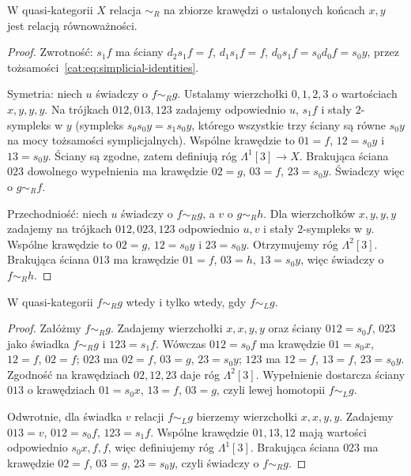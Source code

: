 \begin{lemat}\label{cat:lem:right-homotopy-equivalence}
W quasi-kategorii $X$ relacja $\sim_R$ na zbiorze krawędzi o ustalonych końcach $x,y$ jest relacją równoważności.
\end{lemat}
\begin{proof}
Zwrotność: $s_1f$ ma ściany $d_2s_1f=f$, $d_1s_1f=f$, $d_0s_1f=s_0d_0f=s_0y$, przez tożsamości~\eqref{cat:eq:simplicial-identities}.

Symetria: niech $u$ świadczy o $f\sim_R g$. Ustalamy wierzchołki $0,1,2,3$ o wartościach $x,y,y,y$. Na trójkach $012,013,123$ zadajemy odpowiednio $u$, $s_1f$ i stały $2$-sympleks w $y$ (sympleks $s_0s_0y=s_1s_0y$, którego wszystkie trzy ściany są równe $s_0y$ na mocy tożsamości symplicjalnych). Wspólne krawędzie to $01=f$, $12=s_0y$ i $13=s_0y$. Ściany są zgodne, zatem definiują róg $\Lambda^1[3]\to X$. Brakująca ściana $023$ dowolnego wypełnienia ma krawędzie $02=g$, $03=f$, $23=s_0y$. Świadczy więc o $g\sim_R f$.

Przechodniość: niech $u$ świadczy o $f\sim_R g$, a $v$ o $g\sim_R h$. Dla wierzchołków $x,y,y,y$ zadajemy na trójkach $012,023,123$ odpowiednio $u,v$ i stały $2$-sympleks w $y$. Wspólne krawędzie to $02=g$, $12=s_0y$ i $23=s_0y$. Otrzymujemy róg $\Lambda^2[3]$. Brakująca ściana $013$ ma krawędzie $01=f$, $03=h$, $13=s_0y$, więc świadczy o $f\sim_R h$.
\end{proof}

\begin{stwierdzenie}\label{cat:prop:left-right-homotopy}
W quasi-kategorii $f\sim_R g$ wtedy i tylko wtedy, gdy $f\sim_L g$.
\end{stwierdzenie}
\begin{proof}
Załóżmy $f\sim_R g$. Zadajemy wierzchołki $x,x,y,y$ oraz ściany $012=s_0f$, $023$ jako świadka $f\sim_R g$ i $123=s_1f$. Wówczas $012=s_0f$ ma krawędzie $01=s_0x$, $12=f$, $02=f$; $023$ ma $02=f$, $03=g$, $23=s_0y$; $123$ ma $12=f$, $13=f$, $23=s_0y$. Zgodność na krawędziach $02,12,23$ daje róg $\Lambda^2[3]$. Wypełnienie dostarcza ściany $013$ o krawędziach $01=s_0x$, $13=f$, $03=g$, czyli lewej homotopii $f\sim_L g$.

Odwrotnie, dla świadka $v$ relacji $f\sim_L g$ bierzemy wierzchołki $x,x,y,y$. Zadajemy $013=v$, $012=s_0f$, $123=s_1f$. Wspólne krawędzie $01,13,12$ mają wartości odpowiednio $s_0x,f,f$, więc definiujemy róg $\Lambda^1[3]$. Brakująca ściana $023$ ma krawędzie $02=f$, $03=g$, $23=s_0y$, czyli świadczy o $f\sim_R g$.
\end{proof}

